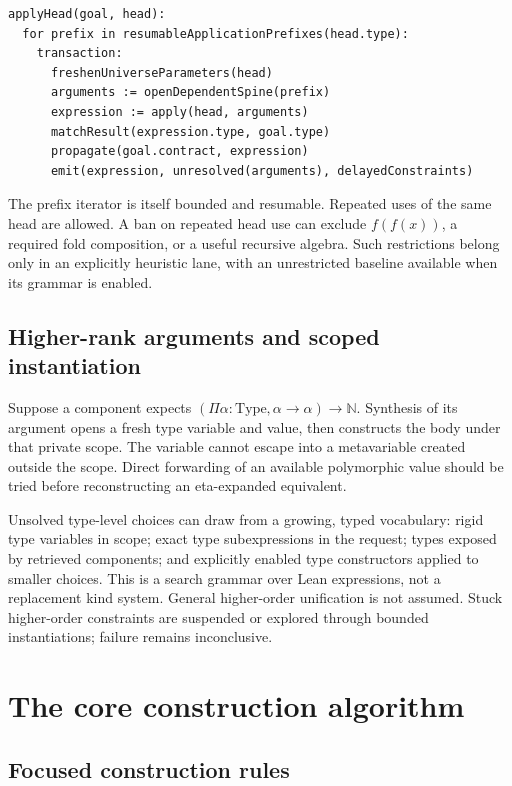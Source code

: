 \documentclass[11pt,letterpaper]{article}
\theoremstyle{definition}
\theoremstyle{remark}
\begin{document}
\Needspace{162pt}
\begin{lstlisting}[caption={Demand-directed component application. Pseudocode.}]
applyHead(goal, head):
  for prefix in resumableApplicationPrefixes(head.type):
    transaction:
      freshenUniverseParameters(head)
      arguments := openDependentSpine(prefix)
      expression := apply(head, arguments)
      matchResult(expression.type, goal.type)
      propagate(goal.contract, expression)
      emit(expression, unresolved(arguments), delayedConstraints)
\end{lstlisting}

The prefix iterator is itself bounded and resumable. Repeated uses of the same head are allowed. A ban on repeated head use can exclude $f(f(x))$, a required fold composition, or a useful recursive algebra. Such restrictions belong only in an explicitly heuristic lane, with an unrestricted baseline available when its grammar is enabled.

\subsection{Higher-rank arguments and scoped instantiation}

Suppose a component expects $(\Pi\alpha:\mathrm{Type},\alpha\to\alpha)\to\mathbb N$. Synthesis of its argument opens a fresh type variable and value, then constructs the body under that private scope. The variable cannot escape into a metavariable created outside the scope. Direct forwarding of an available polymorphic value should be tried before reconstructing an eta-expanded equivalent.

Unsolved type-level choices can draw from a growing, typed vocabulary: rigid type variables in scope; exact type subexpressions in the request; types exposed by retrieved components; and explicitly enabled type constructors applied to smaller choices. This is a search grammar over Lean expressions, not a replacement kind system. General higher-order unification is not assumed. Stuck higher-order constraints are suspended or explored through bounded instantiations; failure remains inconclusive.

\section{The core construction algorithm}
\label{sec:core}

\subsection{Focused construction rules}
\end{document}
